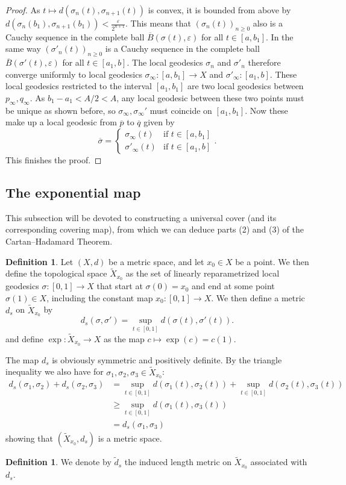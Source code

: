 \documentclass[11pt, a4paper, oneside]{memoir}
\theoremstyle{plain}\newtheorem{theorem}[subsection]{Theorem}
\theoremstyle{definition}
\newtheorem{definition}[subsection]{Definition}
\newcommand{\twiddle}[1]{\widetilde{#1}}
\begin{document}
\begin{proof}
As \(t\mapsto d(\sigma_n(t),\sigma_{n+1}(t))\) is convex, it is bounded from above by \(d(\sigma_n(b_1),\sigma_{n+1}(b_1))<\frac{\varepsilon}{2^{n+1}}\).
This means that \((\sigma_n(t))_{n\geq 0}\) also is a Cauchy sequence in the complete ball \(\overline{B}(\sigma(t),\varepsilon)\) for all \(t\in [a,b_1]\).
In the same way \((\sigma'_n(t))_{n\geq 0}\) is a Cauchy sequence in the complete ball \(\overline{B}(\sigma'(t),\varepsilon)\) for all \(t\in [a_1,b]\).
The local geodesics \(\sigma_n\) and \(\sigma'_n\) therefore converge uniformly to local geodesics \(\sigma_\infty:[a,b_1]\to X\) and \(\sigma'_\infty:[a_1,b]\).
These local geodesics restricted to the interval \([a_1,b_1]\) are two local geodesics between \(p_\infty,q_\infty\).
As \(b_1-a_1<A/2<A\), any local geodesic between these two points must be unique as shown before, so \(\sigma_\infty,\sigma_\infty'\) must coincide on \([a_1,b_1]\).
Now these make up a local geodesic from \(\overline{p}\) to \(\overline{q}\) given by
\[\overline{\sigma}=\begin{cases}
\sigma_\infty(t)   &\text{if }t\in [a,b_1]\\
\sigma'_\infty(t)   &\text{if }t\in[a_1,b]\end{cases}.\]
This finishes the proof.
\end{proof}


\subsection{The exponential map}
This subsection will be devoted to constructing a universal cover (and its corresponding covering map), from which we can deduce parts (2) and (3) of the Cartan--Hadamard Theorem.
\begin{definition}
Let \((X,d)\) be a metric space, and let \(x_0\in X\) be a point.
We then define the topological space \(\twiddle{X}_{x_0}\) as the set of linearly reparametrized local geodesics \(\sigma:[0,1]\to X\) that start at \(\sigma(0)=x_0\) and end at some point \(\sigma(1)\in X\), including the constant map \(x_0:[0,1]\to X\).
We then define a metric $d_s$ on \(\twiddle{X}_{x_0}\) by
\[d_s(\sigma,\sigma')=\sup_{t\in[0,1]}d(\sigma(t),\sigma'(t)).\]
and define \(\exp:\twiddle{X}_{x_0}\to X\) as the map \(c\mapsto \exp(c)=c(1)\).
\end{definition}
The map \(d_s\) is obviously symmetric and positively definite.
By the triangle inequality we also have for \(\sigma_1,\sigma_2,\sigma_3\in\twiddle{X}_{x_0}\):
\begin{align*}
d_s(\sigma_1,\sigma_2)+d_s(\sigma_2,\sigma_3)
&=\sup_{t\in[0,1]}d(\sigma_1(t),\sigma_2(t))+\sup_{t\in[0,1]}d(\sigma_2(t),\sigma_3(t))\\
&\geq\sup_{t\in[0,1]}d(\sigma_1(t),\sigma_3(t))\\
&=d_s(\sigma_1,\sigma_3)
\end{align*}
showing that \((\twiddle{X}_{x_0},d_s)\) is a metric space.
\begin{definition}
   We denote by $\twiddle{d}_s$ the induced length metric on $\twiddle{X}_{x_0}$ associated with $d_s$.
\end{definition}
\end{document}
